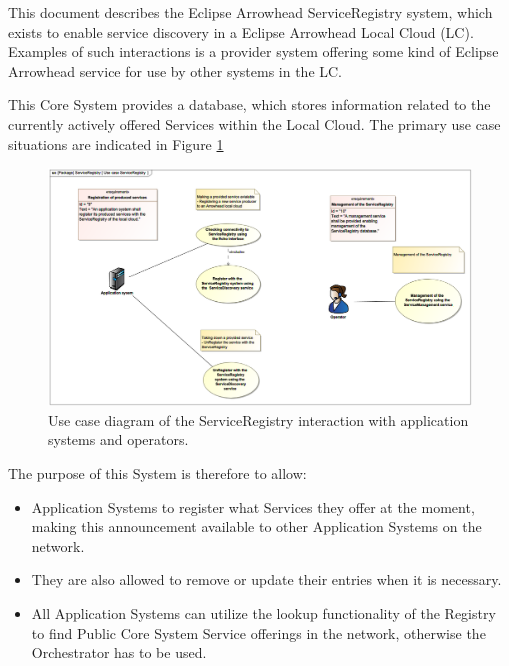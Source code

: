 \documentclass[a4paper]{arrowhead}
\begin{document}
This document describes the Eclipse Arrowhead  ServiceRegistry system,
which exists to enable service discovery in a Eclipse Arrowhead Local Cloud (LC).  Examples of such interactions is a provider system
  offering some kind of Eclipse Arrowhead service for use by other systems in the LC. 

This Core System provides a database, which stores information related
to the currently actively offered Services within the Local Cloud. The
primary use case situations are indicated in Figure \ref{fig:Use_case_ServiceRegistry}

\begin{figure}[ht!]
  \centering
  \includegraphics[width=\textwidth]{figures/Use_case_ServiceRegistry}
  \caption{Use case diagram of the ServiceRegistry interaction with
    application systems and operators. }
  \label{fig:Use_case_ServiceRegistry}
\end{figure}

The purpose of this System is therefore to allow:
\begin{itemize}
\item Application Systems to register what Services they offer at the moment, making this announcement available to other Application Systems on the network.
\item They are also allowed to remove or update their entries when it is necessary.
\item  All Application Systems can utilize the lookup functionality of the Registry to find Public Core System Service offerings in the network, otherwise the Orchestrator has to be used.
\end{itemize}
\end{document}
